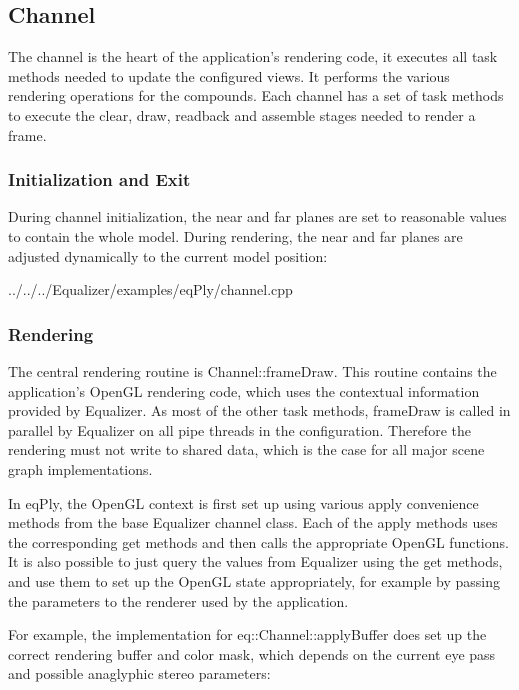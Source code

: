 \documentclass[10pt,a4]{scrartcl}
\begin{document}
\subsection{Channel}

The channel is the heart of the application's rendering code, it executes all
task methods needed to update the configured views. It performs the various
rendering operations for the compounds. Each channel has a set of task methods
to execute the clear, draw, readback and assemble stages needed to render a
frame.

\subsubsection{Initialization and Exit}

During channel initialization, the near and far planes are set to
reasonable values to contain the whole model. During rendering, the near
and far planes are adjusted dynamically to the current model position:

{\footnotesize
  {../../../Equalizer/examples/eqPly/channel.cpp}}

\subsubsection{\label{sRendering}Rendering}

The central rendering routine is \textsf{Channel::frameDraw}. This routine
contains the application's OpenGL rendering code, which uses the contextual
information provided by Equalizer. As most of the other task methods,
\textsf{frameDraw} is called in parallel by Equalizer on all pipe threads in the
configuration. Therefore the rendering must not write to shared data, which is
the case for all major scene graph implementations.

In \textsf{eqPly}, the OpenGL context is first set up using various
\textsf{apply} convenience methods from the base Equalizer channel class. Each
of the \textsf{apply} methods uses the corresponding \textsf{get} methods and
then calls the appropriate OpenGL functions. It is also possible to just query
the values from Equalizer using the \textsf{get} methods, and use them to set up
the OpenGL state appropriately, for example by passing the parameters to the
renderer used by the application.

For example, the implementation for \textsf{eq::Channel::applyBuffer}
does set up the correct rendering buffer and color mask, which depends
on the current eye pass and possible anaglyphic stereo parameters:
\end{document}
